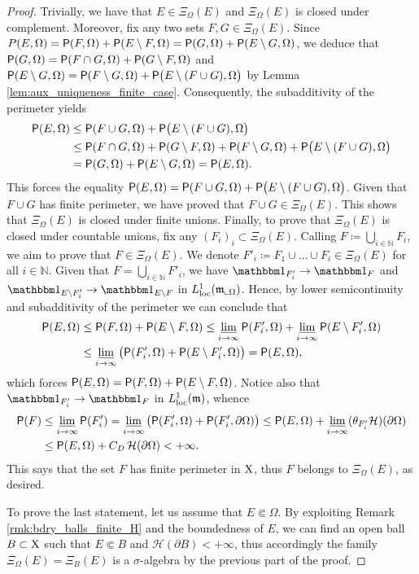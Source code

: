 \documentclass[reqno]{amsart}
\numberwithin{equation}{section}
\newcommand{\N}{\mathbb{N}}
\newcommand{\X}{{\rm X}}
\newcommand{\mm}{\mathfrak m}
\newcommand{\1}{\mathbbm 1}
\newcommand{\limi}{\varliminf}
\newcommand{\loc}{{\rm loc}}
\renewcommand{\P}{{\sf P}}
\renewcommand{\H}{{\mathcal H}}
\begin{document}
\begin{proof}
Trivially, we have that \(E\in\Xi_\Omega(E)\) and \(\Xi_\Omega(E)\) is closed
under complement. Moreover, fix any two sets \(F,G\in\Xi_\Omega(E)\).
Since \(P(E,\Omega)=\P(F,\Omega)+\P(E\setminus F,\Omega)
=\P(G,\Omega)+\P(E\setminus G,\Omega)\), we deduce that
\(\P(G,\Omega)=\P(F\cap G,\Omega)+\P(G\setminus F,\Omega)\) and
\(\P(E\setminus G,\Omega)=\P(F\setminus G,\Omega)+\P\big(E\setminus(F\cup G),\Omega\big)\)
by Lemma \ref{lem:aux_uniqueness_finite_case}.
Consequently, the subadditivity of the perimeter yields
\[\begin{split}
\P(E,\Omega)&\leq\P(F\cup G,\Omega)+\P\big(E\setminus(F\cup G),\Omega\big)\\
&\leq\P(F\cap G,\Omega)+\P(G\setminus F,\Omega)
+\P(F\setminus G,\Omega)+\P\big(E\setminus(F\cup G),\Omega\big)\\
&=\P(G,\Omega)+\P(E\setminus G,\Omega)=\P(E,\Omega).
\end{split}\]
This forces the equality
\(\P(E,\Omega)=\P(F\cup G,\Omega)+\P\big(E\setminus(F\cup G),\Omega\big)\).
Given that \(F\cup G\) has finite perimeter, we have proved that
\(F\cup G\in\Xi_\Omega(E)\). This shows that \(\Xi_\Omega(E)\) is closed
under finite unions. Finally, to prove that \(\Xi_\Omega(E)\) is closed
under countable unions, fix any \((F_i)_i\subset\Xi_\Omega(E)\). Calling
\(F\coloneqq\bigcup_{i\in\N}F_i\), we aim to prove that \(F\in\Xi_\Omega(E)\).
We denote \(F'_i\coloneqq F_1\cup\ldots\cup F_i\in\Xi_\Omega(E)\) for all \(i\in\N\).
Given that \(F=\bigcup_{i\in\N}F'_i\), we have \(\1_{F'_i}\to\1_F\) and
\(\1_{E\setminus F'_i}\to\1_{E\setminus F}\) in \(L^1_\loc(\mm_{\llcorner\Omega})\).
Hence, by lower semicontinuity and subadditivity of the perimeter we can conclude that
\[\begin{split}
\P(E,\Omega)&\leq\P(F,\Omega)+\P(E\setminus F,\Omega)
\leq\limi_{i\to\infty}\P(F'_i,\Omega)+\limi_{i\to\infty}\P(E\setminus F'_i,\Omega)\\
&\leq\limi_{i\to\infty}\big(\P(F'_i,\Omega)+\P(E\setminus F'_i,\Omega)\big)=\P(E,\Omega),
\end{split}\]
which forces \(\P(E,\Omega)=\P(F,\Omega)+\P(E\setminus F,\Omega)\).
Notice also that \(\1_{F'_i}\to\1_F\) in \(L^1_\loc(\mm)\), whence
\[\begin{split}
\P(F)&\leq\limi_{i\to\infty}\P(F'_i)=
\limi_{i\to\infty}\big(\P(F'_i,\Omega)+\P(F'_i,\partial\Omega)\big)
\leq\P(E,\Omega)+\limi_{i\to\infty}(\theta_{F'_i}\H)(\partial\Omega)\\
&\leq\P(E,\Omega)+C_D\,\H(\partial\Omega)<+\infty.
\end{split}\]
This says that the set \(F\) has finite perimeter in \(\X\), thus \(F\) belongs to
\(\Xi_\Omega(E)\), as desired.

To prove the last statement, let us assume that \(E\Subset\Omega\). By exploiting
Remark \ref{rmk:bdry_balls_finite_H} and the boundedness of \(E\),
we can find an open ball \(B\subset\X\) such that
\(E\Subset B\) and \(\H(\partial B)<+\infty\), thus accordingly the family
\(\Xi_\Omega(E)=\Xi_B(E)\) is a \(\sigma\)-algebra
by the previous part of the proof.
\end{proof}
\end{document}
